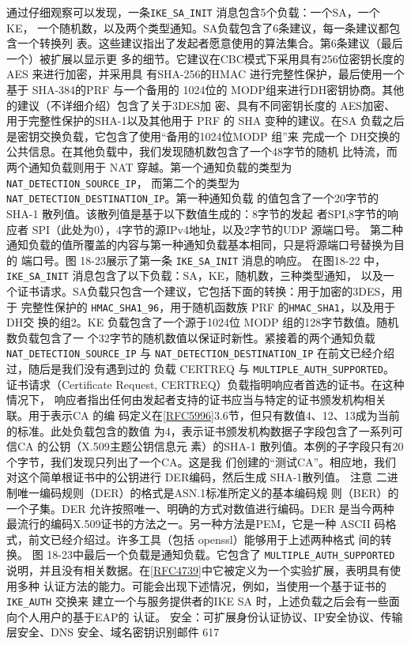 通过仔细观察可以发现，一条\verb|IKE_SA_INIT| 消息包含5个负载：一个SA，一个KE，
一个随机数，以及两个类型通知。SA负载包含了6条建议，每一条建议都包含一个转换列
表。这些建议指出了发起者愿意使用的算法集合。第6条建议（最后一个）被扩展以显示更
多的细节。它建议在CBC模式下采用具有256位密钥长度的AES 来进行加密，并采用具
有SHA-256的HMAC 进行完整性保护，最后使用一个基于 SHA-384的PRF 与一个备用的
1024位的 MODP组来进行DH密钥协商。其他的建议（不详细介绍）包含了关于3DES加
密、具有不同密钥长度的 AES加密、用于完整性保护的SHA-1以及其他用于 PRF 的 SHA
变种的建议。在SA 负载之后是密钥交换负载，它包含了使用“备用的1024位MODP 组”来
完成一个 DH交换的公共信息。在其他负载中，我们发现随机数包含了一个48字节的随机
比特流，而两个通知负载则用于 NAT 穿越。第一个通知负载的类型为 \verb|NAT_DETECTION_SOURCE_IP|，
而第二个的类型为 \verb|NAT_DETECTION_DESTINATION_IP|。第一种通知负载
的值包含了一个20字节的SHA-1 散列值。该散列值是基于以下数值生成的：8字节的发起
者SPI,8字节的响应者 SPI（此处为0），4字节的源IPv4地址，以及2字节的UDP 源端口号。
第二种通知负载的值所覆盖的内容与第一种通知负载基本相同，只是将源端口号替换为目的
端口号。图 18-23展示了第一条 \verb|IKE_SA_INIT| 消息的响应。
在图18-22 中，\verb|IKE_SA_INIT| 消息包含了以下负载：SA，KE，随机数，三种类型通知，
以及一个证书请求。SA负载只包含一个建议，它包括下面的转换：用于加密的3DES，用于
完整性保护的 \verb|HMAC_SHA1_96|，用于随机函数族 PRF 的\verb|HMAC_SHA1|，以及用于DH交
换的组2。KE 负载包含了一个源于1024位 MODP 组的128字节数值。随机数负载包含了一
个32字节的随机数值以保证时新性。紧接着的两个通知负载 \verb|NAT_DETECTION_SOURCE_IP|
与 \verb|NAT_DETECTION_DESTINATION_IP| 在前文已经介绍过，随后是我们没有遇到过的
负载 CERTREQ 与 \verb|MULTIPLE_AUTH_SUPPORTED|。
证书请求（Certificate Request, CERTREQ）负载指明响应者首选的证书。在这种情况下，
响应者指出任何由发起者支持的证书应当与特定的证书颁发机构相关联。用于表示CA 的编
码定义在\href{https://www.rfc-editor.org/rfc/rfc5996}{[RFC5996]}3.6节，但只有数值4、12、13成为当前的标准。此处负载包含的数值
为4，表示证书颁发机构数据子字段包含了一系列可信CA 的公钥（X.509主题公钥信息元
素）的SHA-1 散列值。本例的子字段只有20个字节，我们发现只列出了一个CA。这是我
们创建的“测试CA”。相应地，我们对这个简单根证书中的公钥进行 DER编码，然后生成
SHA-1散列值。
注意 二进制唯一编码规则（DER）的格式是ASN.1标准所定义的基本编码规
则（BER）的一个子集。DER 允许按照唯一、明确的方式对数值进行编码。DER
是当今两种最流行的编码X.509证书的方法之一。另一种方法是PEM，它是一种
ASCII 码格式，前文已经介绍过。许多工具（包括 openssl）能够用于上述两种格式
间的转换。
图 18-23中最后一个负载是通知负载。它包含了 \verb|MULTIPLE_AUTH_SUPPORTED|
说明，并且没有相关数据。在\href{https://www.rfc-editor.org/rfc/rfc4739}{[RFC4739]}中它被定义为一个实验扩展，表明具有使用多种
认证方法的能力。可能会出现下述情况，例如，当使用一个基于证书的\verb|IKE_AUTH| 交换来
建立一个与服务提供者的IKE SA 时，上述负载之后会有一些面向个人用户的基于EAP的
认证。
安全：可扩展身份认证协议、IP安全协议、传输层安全、DNS 安全、域名密钥识别邮件 617

